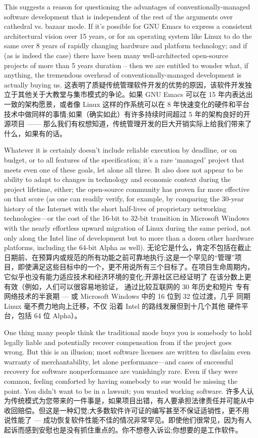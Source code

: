 \documentclass[a4paper,12pt,UTF8,twoside]{ctexbook}
\begin{document}
This suggests a reason for questioning the advantages of conventionally-managed software development that is independent of the rest of the arguments over cathedral vs. bazaar mode. If it's possible for GNU Emacs to express a consistent architectural vision over 15 years, or for an operating system like Linux to do the same over 8 years of rapidly changing hardware and platform technology; and if (as is indeed the case) there have been many well-architected open-source projects of more than 5 years duration -- then we are entitled to wonder what, if anything, the tremendous overhead of conventionally-managed development is actually buying us.
这表明了质疑传统管理软件开发的优势的原因，该软件开发独立于其他关于大教堂与集市模式的争论。如果 GNU Emacs 可以在 15 年内表达出一致的架构愿景，或者像 Linux 这样的作系统可以在 8 年快速变化的硬件和平台技术中做同样的事情;如果（确实如此）有许多持续时间超过 5 年的架构良好的开源项目 —— 那么我们有权想知道，传统管理开发的巨大开销实际上给我们带来了什么，如果有的话。

Whatever it is certainly doesn't include reliable execution by deadline, or on budget, or to all features of the specification; it's a rare `managed' project that meets even one of these goals, let alone all three. It also does not appear to be ability to adapt to changes in technology and economic context during the project lifetime, either; the open-source community has proven far more effective on that score (as one can readily verify, for example, by comparing the 30-year history of the Internet with the short half-lives of proprietary networking technologies—or the cost of the 16-bit to 32-bit transition in Microsoft Windows with the nearly effortless upward migration of Linux during the same period, not only along the Intel line of development but to more than a dozen other hardware platforms, including the 64-bit Alpha as well).
无论它是什么，肯定不包括在截止日期前、在预算内或规范的所有功能之前可靠地执行;这是一个罕见的“管理”项目，即使满足这些目标中的一个，更不用说所有三个目标了。在项目生命周期内，它似乎也没有能力适应技术和经济环境的变化;开源社区已经证明了 在该分数上更有效（例如，人们可以很容易地验证， 通过比较互联网的 30 年历史和短片 专有网络技术的半衰期 — 或 Microsoft Windows 中的 16 位到 32 位过渡，几乎 同期 Linux 毫不费力地向上迁移，不仅 沿着 Intel 的路线发展但到十几个其他 硬件平台，包括 64 位 Alpha）。

One thing many people think the traditional mode buys you is somebody to hold legally liable and potentially recover compensation from if the project goes wrong. But this is an illusion; most software licenses are written to disclaim even warranty of merchantability, let alone performance—and cases of successful recovery for software nonperformance are vanishingly rare. Even if they were common, feeling comforted by having somebody to sue would be missing the point. You didn't want to be in a lawsuit; you wanted working software.
许多人认为传统模式为您带来的一件事是，如果项目出错，有人要承担法律责任并可能从中收回赔偿。但这是一种幻觉;大多数软件许可证的编写甚至不保证适销性，更不用说性能了 — 成功恢复软件性能不佳的情况非常罕见。即使他们很常见，因为有人起诉而感到安慰也是没有抓住重点的。你不想卷入诉讼;你想要的是工作软件。
\end{document}
